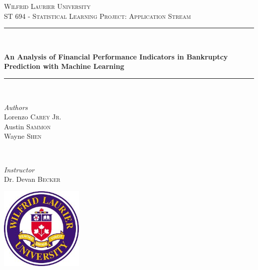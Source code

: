 \documentclass[12pt]{report}
\begin{document}
\begin{titlepage} 
	\newcommand{\HRule}{\rule{\linewidth}{0.5mm}} 
	\center 
	
	\textsc{\LARGE Wilfrid Laurier University}\\[1.5cm] %
	
	\textsc{\Large ST 694 - Statistical Learning Project: Application Stream}\\[0.5cm] %
	
	\HRule\\[0.4cm]
	{\large\bfseries An Analysis of Financial Performance Indicators in Bankruptcy Prediction with Machine Learning
	
	\HRule\\[1.5cm]
	\begin{minipage}{0.4\textwidth}
		\begin{flushleft}
			\large
			\textit{Authors}\\
                Lorenzo \textsc{Carey Jr.} \\
                Austin \textsc{Sammon}\\
			Wayne \textsc{Shen}\\
		\end{flushleft}
	\end{minipage}
	~
	\begin{minipage}{0.4\textwidth}
		\begin{flushright}
			\large
			\textit{Instructor}\\
			Dr. Devan \textsc{Becker} %
		\end{flushright}
	\end{minipage}
	\vfill\vfill\vfill
	
	\vfill\vfill\vfill
	\includegraphics[width=0.3\textwidth]{Pictures/Wlu_colour_logo.jpg}\\[0.1cm] 
	
	\vfill
	}
\end{titlepage}

\end{document}
